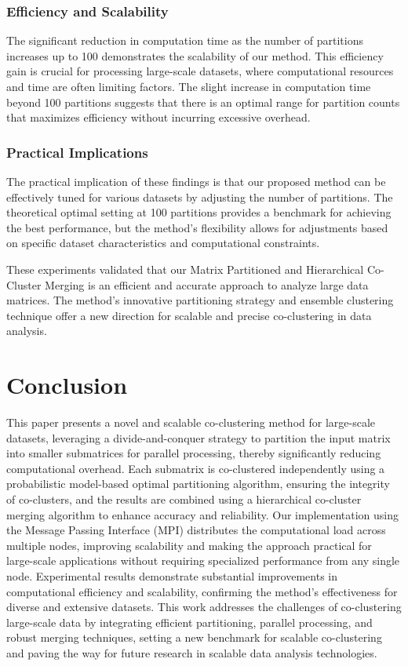 \documentclass[journal]{IEEEtran}
\begin{document}
\subsubsection{Efficiency and Scalability}
The significant reduction in computation time as the number of partitions increases up to 100 demonstrates the scalability of our method. This efficiency gain is crucial for processing large-scale datasets, where computational resources and time are often limiting factors. The slight increase in computation time beyond 100 partitions suggests that there is an optimal range for partition counts that maximizes efficiency without incurring excessive overhead.

\subsubsection{Practical Implications}
The practical implication of these findings is that our proposed method can be effectively tuned for various datasets by adjusting the number of partitions. The theoretical optimal setting at 100 partitions provides a benchmark for achieving the best performance, but the method's flexibility allows for adjustments based on specific dataset characteristics and computational constraints.

These experiments validated that our Matrix Partitioned and Hierarchical Co-Cluster Merging is an efficient and accurate approach to analyze large data matrices. The method's innovative partitioning strategy and ensemble clustering technique offer a new direction for scalable and precise co-clustering in data analysis.

\section{Conclusion}
\label{sec:conclusion}
This paper presents a novel and scalable co-clustering method for large-scale datasets, leveraging a divide-and-conquer strategy to partition the input matrix into smaller submatrices for parallel processing, thereby significantly reducing computational overhead. Each submatrix is co-clustered independently using a probabilistic model-based optimal partitioning algorithm, ensuring the integrity of co-clusters, and the results are combined using a hierarchical co-cluster merging algorithm to enhance accuracy and reliability. Our implementation using the Message Passing Interface (MPI) distributes the computational load across multiple nodes, improving scalability and making the approach practical for large-scale applications without requiring specialized performance from any single node. Experimental results demonstrate substantial improvements in computational efficiency and scalability, confirming the method's effectiveness for diverse and extensive datasets. This work addresses the challenges of co-clustering large-scale data by integrating efficient partitioning, parallel processing, and robust merging techniques, setting a new benchmark for scalable co-clustering and paving the way for future research in scalable data analysis technologies.


\printbibliography
\end{document}
